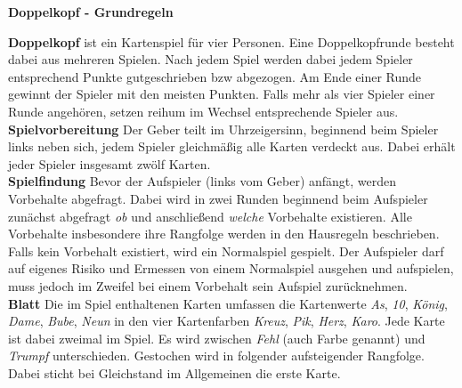 \documentclass[11pt,a4paper,landscape]{article}
\begin{document}
\begin{center}
\textbf{Doppelkopf - Grundregeln}
\end{center}

\begin{multicols}{3}


\textbf{Doppelkopf} ist ein Kartenspiel für vier Personen. Eine Doppelkopfrunde besteht dabei aus mehreren Spielen. Nach jedem Spiel werden dabei jedem Spieler entsprechend Punkte gutgeschrieben bzw abgezogen. Am Ende einer Runde gewinnt der Spieler mit den meisten Punkten. Falls mehr als vier Spieler einer Runde angehören, setzen reihum im Wechsel entsprechende Spieler aus. \\

\textbf{Spielvorbereitung} Der Geber teilt im Uhrzeigersinn, beginnend beim Spieler links neben sich, jedem Spieler gleichmäßig alle Karten verdeckt aus. Dabei erhält jeder Spieler insgesamt zwölf Karten. \\

\textbf{Spielfindung} Bevor der Aufspieler (links vom Geber) anfängt, werden Vorbehalte abgefragt. Dabei wird in zwei Runden beginnend beim Aufspieler zunächst abgefragt \textit{ob} und anschließend \textit{welche} Vorbehalte existieren. Alle Vorbehalte insbesondere ihre Rangfolge werden in den Hausregeln beschrieben. Falls kein Vorbehalt existiert, wird ein Normalspiel gespielt. Der Aufspieler darf auf eigenes Risiko und Ermessen von einem Normalspiel ausgehen und aufspielen, muss jedoch im Zweifel bei einem Vorbehalt sein Aufspiel zurücknehmen. \\

\textbf{Blatt} 
Die im Spiel enthaltenen Karten umfassen die Kartenwerte \textit{As}, \textit{10}, \textit{König}, \textit{Dame}, \textit{Bube}, \textit{Neun} in den vier Kartenfarben \textit{Kreuz}, \textit{Pik}, \textit{Herz}, \textit{Karo}. Jede Karte ist dabei zweimal im Spiel. Es wird zwischen \textit{Fehl} (auch Farbe genannt) und \textit{Trumpf} unterschieden. Gestochen wird in folgender aufsteigender Rangfolge. Dabei sticht bei Gleichstand im Allgemeinen die erste Karte.\\


\end{multicols}
\end{document}
